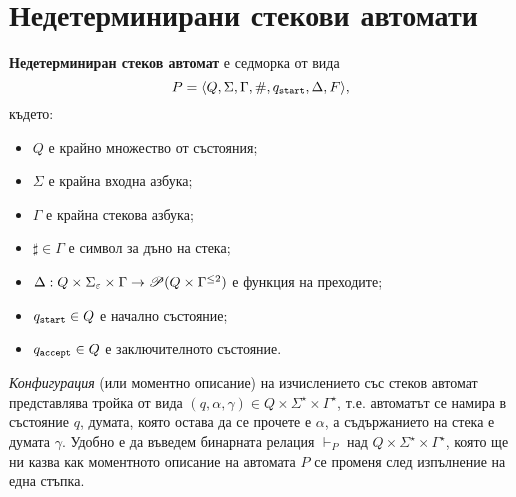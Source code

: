 \section{Недетерминирани стекови автомати}

{\bf Недетерминиран стеков автомат} е седморка от вида
\[P = \langle{Q,\Sigma,\Gamma,\#,q_{\texttt{start}},\Delta,F}\rangle,\] където:
\begin{itemize}
\item
  $Q$ е крайно множество от състояния;
\item  
  $\Sigma$ е крайна входна азбука;
\item
  $\Gamma$ е крайна стекова азбука;
\item
  $\sharp \in \Gamma$ е символ за дъно на стека;
\item
  $\Delta:Q\times\Sigma_\varepsilon\times \Gamma \rightarrow \mathscr{P}(Q\times\Gamma^{\leq 2})$ 
  е функция на преходите;    
\item
  $q_{\texttt{start}} \in Q$ е начално състояние;
\item
  $q_{\texttt{accept}} \in Q$ е заключителното състояние.
\end{itemize}

\emph{Конфигурация} (или моментно описание) на изчислението със стеков автомат представлява тройка от вида $(q,\alpha,\gamma) \in Q\times\Sigma^\star\times\Gamma^\star$,
т.е. автоматът се намира в състояние $q$, думата, която остава да се прочете е $\alpha$,
а съдържанието на стека е думата $\gamma$.
Удобно е да въведем бинарната релация $\vdash_P$ над $Q\times\Sigma^\star\times\Gamma^\star$,
която ще ни казва как моментното описание на автомата $P$ се променя след изпълнение на една стъпка.


